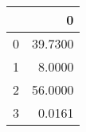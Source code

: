 \begin{tabular}{lr}
\toprule
{} &        0 \\
\midrule
0 &  39.7300 \\
1 &   8.0000 \\
2 &  56.0000 \\
3 &   0.0161 \\
\bottomrule
\end{tabular}

